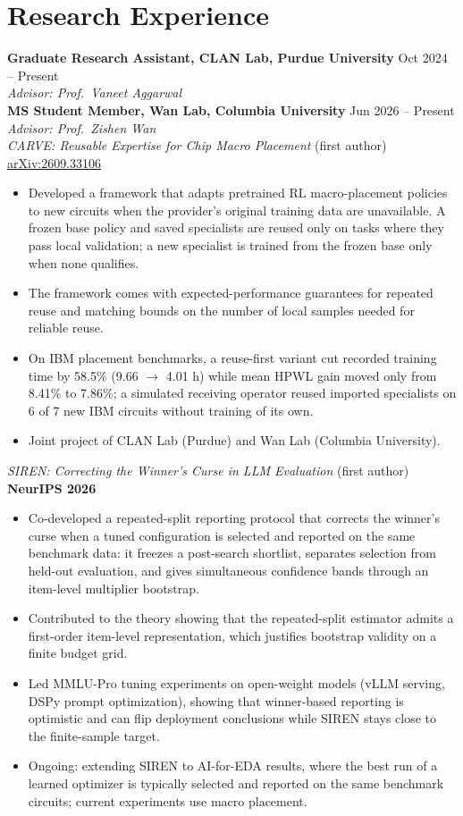 \documentclass[11pt, letterpaper]{article}
\begin{document}
\section{Research Experience}
\textbf{Graduate Research Assistant, CLAN Lab, Purdue University} \hfill Oct 2024 -- Present \\
\textit{Advisor: Prof.\ Vaneet Aggarwal} \\[2pt]
\textbf{MS Student Member, Wan Lab, Columbia University} \hfill Jun 2026 -- Present \\
\textit{Advisor: Prof.\ Zishen Wan} \\[4pt]
\textit{CARVE: Reusable Expertise for Chip Macro Placement} (first author) \hfill \href{https://arxiv.org/abs/2609.33106}{arXiv:2609.33106}
\begin{itemize}
    \item Developed a framework that adapts pretrained RL macro-placement policies to new circuits when the provider's original training data are unavailable. A frozen base policy and saved specialists are reused only on tasks where they pass local validation; a new specialist is trained from the frozen base only when none qualifies.
    \item The framework comes with expected-performance guarantees for repeated reuse and matching bounds on the number of local samples needed for reliable reuse.
    \item On IBM placement benchmarks, a reuse-first variant cut recorded training time by 58.5\% (9.66 $\rightarrow$ 4.01 h) while mean HPWL gain moved only from 8.41\% to 7.86\%; a simulated receiving operator reused imported specialists on 6 of 7 new IBM circuits without training of its own.
    \item Joint project of CLAN Lab (Purdue) and Wan Lab (Columbia University).
\end{itemize}
\textit{SIREN: Correcting the Winner's Curse in LLM Evaluation} (first author) \hfill \textbf{NeurIPS 2026}
\begin{itemize}
    \item Co-developed a repeated-split reporting protocol that corrects the winner's curse when a tuned configuration is selected and reported on the same benchmark data: it freezes a post-search shortlist, separates selection from held-out evaluation, and gives simultaneous confidence bands through an item-level multiplier bootstrap.
    \item Contributed to the theory showing that the repeated-split estimator admits a first-order item-level representation, which justifies bootstrap validity on a finite budget grid.
    \item Led MMLU-Pro tuning experiments on open-weight models (vLLM serving, DSPy prompt optimization), showing that winner-based reporting is optimistic and can flip deployment conclusions while SIREN stays close to the finite-sample target.
    \item Ongoing: extending SIREN to AI-for-EDA results, where the best run of a learned optimizer is typically selected and reported on the same benchmark circuits; current experiments use macro placement.
\end{itemize}
\end{document}
